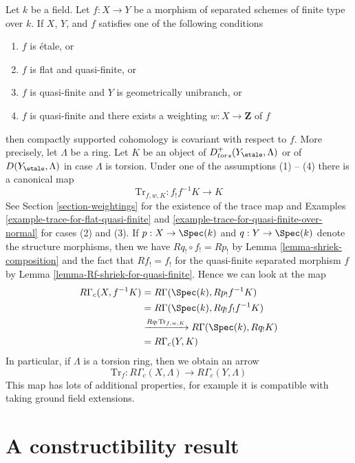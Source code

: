 \begin{remark}
\label{remark-covariance-compactly-supported}
Let $k$ be a field. Let $f : X \to Y$ be a morphism of separated
schemes of finite type over $k$. If $X$, $Y$, and $f$ satisfies one
of the following conditions
\begin{enumerate}
\item $f$ is \'etale, or
\item $f$ is flat and quasi-finite, or
\item $f$ is quasi-finite and $Y$ is geometrically unibranch, or
\item $f$ is quasi-finite and there exists a weighting
$w : X \to \mathbf{Z}$ of $f$
\end{enumerate}
then compactly supported cohomology is covariant with respect to $f$.
More precisely, let $\Lambda$ be a ring. Let $K$ be an object of
$D^+_{tors}(Y_\etale, \Lambda)$ or of $D(Y_\etale, \Lambda)$ in case
$\Lambda$ is torsion. Under one of the assumptions (1) -- (4)
there is a canonical map
$$
\text{Tr}_{f, w, K} : f_!f^{-1}K \longrightarrow K
$$
See Section \ref{section-weightings} for the existence of the
trace map and Examples \ref{example-trace-for-flat-quasi-finite} and
\ref{example-trace-for-quasi-finite-over-normal} for cases (2) and (3).
If $p : X \to \Spec(k)$ and $q : Y \to \Spec(k)$ denote
the structure morphisms, then we have $Rq_! \circ f_! = Rp_!$
by Lemma \ref{lemma-shriek-composition} and the fact that
$Rf_! = f_!$ for the quasi-finite separated morphism $f$ by
Lemma \ref{lemma-Rf-shriek-for-quasi-finite}. Hence we can look
at the map
\begin{align*}
R\Gamma_c(X, f^{-1}K)
& =
R\Gamma(\Spec(k), Rp_!f^{-1}K) \\
& =
R\Gamma(\Spec(k), Rq_!f_!f^{-1}K) \\
& \xrightarrow{Rq_!\text{Tr}_{f, w, K}}
R\Gamma(\Spec(k), Rq_!K) \\
& =
R\Gamma_c(Y, K)
\end{align*}
In particular, if $\Lambda$ is a torsion ring, then we obtain an arrow
$$
\text{Tr}_f : R\Gamma_c(X, \Lambda) \longrightarrow R\Gamma_c(Y, \Lambda)
$$
This map has lots of additional properties, for example it is
compatible with taking ground field extensions.
\end{remark}










\section{A constructibility result}
\label{section-family-smooth-curves-cohomology}

